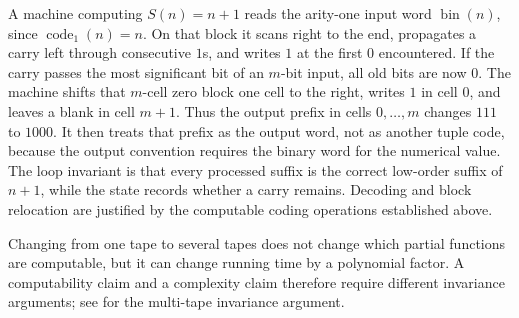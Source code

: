 \begin{example}
A machine computing \(S(n)=n+1\) reads the arity-one input word
\(\operatorname{bin}(n)\), since \(\operatorname{code}_1(n)=n\).  On that block it
scans right to the end, propagates a carry left through consecutive \(1\)s,
 and writes \(1\) at the first \(0\) encountered.  If the carry passes the most
 significant bit of an \(m\)-bit input, all old bits are now \(0\).  The
 machine shifts that \(m\)-cell zero block one cell to the right, writes \(1\)
 in cell \(0\), and leaves a blank in cell \(m+1\).  Thus the output prefix in
 cells \(0,\ldots,m\) changes \(111\) to \(1000\).  It then treats that prefix as the output
word, not as another tuple code, because the output convention requires the
binary word for the numerical value.  The loop invariant is that every
processed suffix is the correct low-order suffix of \(n+1\), while the state
records whether a carry remains.  Decoding and block relocation are justified
by the computable coding operations established above.
\end{example}

\begin{warning}
Changing from one tape to several tapes does not change which partial functions
are computable, but it can change running time by a polynomial factor.  A
computability claim and a complexity claim therefore require different
invariance arguments; see \cite{BoolosBurgessJeffrey2007} for the
multi-tape invariance argument.
\end{warning}

